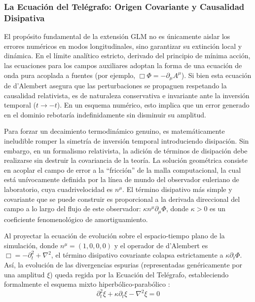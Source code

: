 \subsubsection{La Ecuación del Telégrafo: Origen Covariante y Causalidad Disipativa}

\primerparrafo El propósito fundamental de la extensión GLM no es únicamente aislar los errores numéricos en modos longitudinales, sino garantizar su extinción local y dinámica. En el límite analítico estricto, derivado del principio de mínima acción, las ecuaciones para los campos auxiliares adoptan la forma de una ecuación de onda pura acoplada a fuentes (por ejemplo, $\Box \Phi = -\partial_\mu A^\mu$). Si bien esta ecuación de d'Alembert asegura que las perturbaciones se propaguen respetando la causalidad relativista, es de naturaleza conservativa e invariante ante la inversión temporal ($t \rightarrow -t$). En un esquema numérico, esto implica que un error generado en el dominio rebotaría indefinidamente sin disminuir su amplitud.

Para forzar un decaimiento termodinámico genuino, es matemáticamente ineludible romper la simetría de inversión temporal introduciendo disipación. Sin embargo, en un formalismo relativista, la adición de términos de disipación debe realizarse sin destruir la covariancia de la teoría. La solución geométrica consiste en acoplar el campo de error a la ``fricción'' de la malla computacional, la cual está unívocamente definida por la línea de mundo del observador euleriano de laboratorio, cuya cuadrivelocidad es $n^\mu$. El término disipativo más simple y covariante que se puede construir es proporcional a la derivada direccional del campo a lo largo del flujo de este observador: $\kappa n^\mu \partial_\mu \Phi$, donde $\kappa > 0$ es un coeficiente fenomenológico de amortiguamiento.

Al proyectar la ecuación de evolución sobre el espacio-tiempo plano de la simulación, donde $n^\mu = (1, 0, 0, 0)$ y el operador de d'Alembert es $\Box = -\partial_t^2 + \nabla^2$, el término disipativo covariante colapsa estrictamente a $\kappa \partial_t \Phi$. Así, la evolución de las divergencias espurias (representadas genéricamente por una amplitud $\xi$) queda regida por la Ecuación del Telégrafo, estableciendo formalmente el esquema mixto hiperbólico-parabólico \parencite{gomes2015}:
\begin{equation}
    \partial_t^2 \xi + \kappa \partial_t \xi - \nabla^2 \xi = 0
\end{equation}

